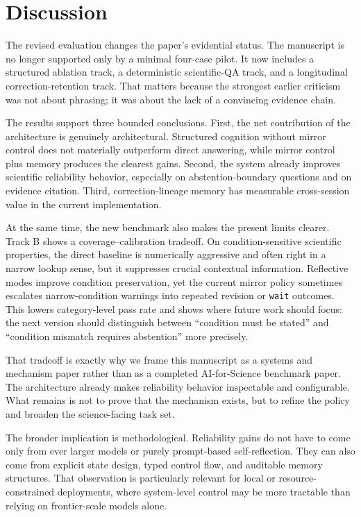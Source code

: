 \documentclass[12pt]{article}
\begin{document}
\section{Discussion}

The revised evaluation changes the paper's evidential status. The manuscript is no longer supported only by a minimal four-case pilot. It now includes a structured ablation track, a deterministic scientific-QA track, and a longitudinal correction-retention track. That matters because the strongest earlier criticism was not about phrasing; it was about the lack of a convincing evidence chain.

The results support three bounded conclusions. First, the net contribution of the architecture is genuinely architectural. Structured cognition without mirror control does not materially outperform direct answering, while mirror control plus memory produces the clearest gains. Second, the system already improves scientific reliability behavior, especially on abstention-boundary questions and on evidence citation. Third, correction-lineage memory has measurable cross-session value in the current implementation.

At the same time, the new benchmark also makes the present limits clearer. Track B shows a coverage--calibration tradeoff. On condition-sensitive scientific properties, the direct baseline is numerically aggressive and often right in a narrow lookup sense, but it suppresses crucial contextual information. Reflective modes improve condition preservation, yet the current mirror policy sometimes escalates narrow-condition warnings into repeated revision or \texttt{wait} outcomes. This lowers category-level pass rate and shows where future work should focus: the next version should distinguish between ``condition must be stated'' and ``condition mismatch requires abstention'' more precisely.

That tradeoff is exactly why we frame this manuscript as a systems and mechanism paper rather than as a completed AI-for-Science benchmark paper. The architecture already makes reliability behavior inspectable and configurable. What remains is not to prove that the mechanism exists, but to refine the policy and broaden the science-facing task set.

The broader implication is methodological. Reliability gains do not have to come only from ever larger models or purely prompt-based self-reflection. They can also come from explicit state design, typed control flow, and auditable memory structures. That observation is particularly relevant for local or resource-constrained deployments, where system-level control may be more tractable than relying on frontier-scale models alone.
\end{document}

